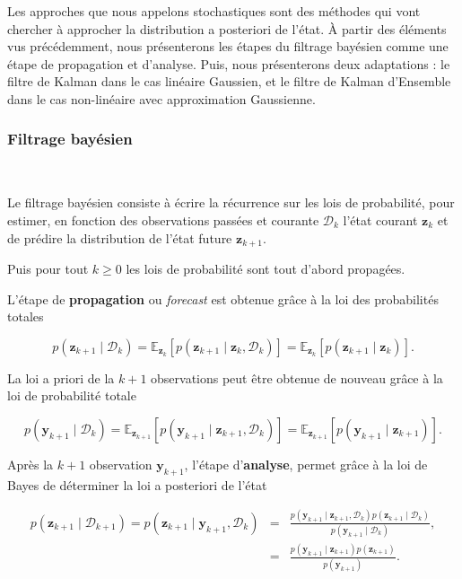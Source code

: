 Les approches que nous appelons stochastiques sont des méthodes qui vont chercher à approcher la distribution a posteriori de l'état. À partir des éléments vus précédemment, nous présenterons les étapes du filtrage bayésien comme une étape de propagation et d'analyse. Puis, nous présenterons deux adaptations : le filtre de Kalman dans le cas linéaire Gaussien, et le filtre de Kalman d'Ensemble dans le cas non-linéaire avec approximation Gaussienne.

\subsubsection{Filtrage bayésien}~\label{filtrage_bayesien}

Le filtrage bayésien consiste à écrire la récurrence sur les lois de probabilité, pour estimer, en fonction des observations passées et courante $\mathcal D_k$ l'état courant $\bm z_k$ et de prédire la distribution de l'état future $\bm z_{k+1}$.

Puis pour tout $k \geq 0$ les lois de probabilité sont tout d'abord propagées.

L'étape de \textbf{propagation} ou \textit{forecast} est obtenue grâce à la loi des probabilités totales

\begin{equation*}
    p(\bm z_{k+1} \mid \mathcal D_k) = \mathbb{E}_{\bm z_k}\left[p(\bm z_{k+1} \mid  \bm z_k,\mathcal{D}_k) \right] = \mathbb{E}_{\bm z_k}\left[p(\bm z_{k+1} \mid \bm z_k)\right].
\end{equation*}

La loi a priori de la $k+1$ observations peut être obtenue de nouveau grâce à la loi de probabilité totale

\begin{equation*}
    p(\bm y_{k+1} \mid \mathcal D_k) = \mathbb{E}_{\bm{z}_{k+1}}\left[p(\bm y_{k+1}\mid \bm z_{k+1},\mathcal D_k)\right] = \mathbb{E}_{\bm{z}_{k+1}}\left[p(\bm y_{k+1}\mid \bm z_{k+1})\right].
\end{equation*}

Après la $k+1$ observation $\bm y_{k+1}$, l'étape d'\textbf{analyse}, permet grâce à la loi de Bayes de déterminer la loi a posteriori de l'état

\begin{eqnarray*}
    p(\bm z_{k+1} \mid \mathcal D_{k+1}) = p(\bm z_{k+1} \mid \bm y_{k+1}, \mathcal D_{k})  &=& \frac{p(\bm y_{k+1} \mid \bm z_{k+1} ,\mathcal D_k)  p(\bm z_{k+1}\mid \mathcal D_k)}{p(\bm y_{k+1}\mid \mathcal D_k)}, \\
    &=& \frac{p(\bm y_{k+1} \mid \bm z_{k+1})  p(\bm z_{k+1})}{p(\bm y_{k+1})}.
\end{eqnarray*}

